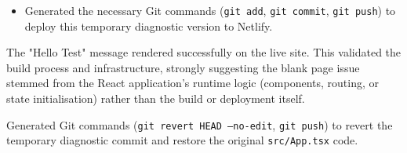 \documentclass[11pt]{article} %
\begin{document}
\begin{description}[style=unboxed,leftmargin=0pt]
\begin{itemize}
            \item Generated the necessary Git commands (\texttt{git add}, \texttt{git commit}, \texttt{git push}) to deploy this temporary diagnostic version to Netlify.
        \end{itemize}
    \item[Outcome:] The "Hello Test" message rendered successfully on the live site. This validated the build process and infrastructure, strongly suggesting the blank page issue stemmed from the React application's runtime logic (components, routing, or state initialisation) rather than the build or deployment itself.
    \item[AI Assistance (Cleanup):] Generated Git commands (\texttt{git revert HEAD --no-edit}, \texttt{git push}) to revert the temporary diagnostic commit and restore the original \texttt{src/App.tsx} code.
\end{description}
\end{document}
